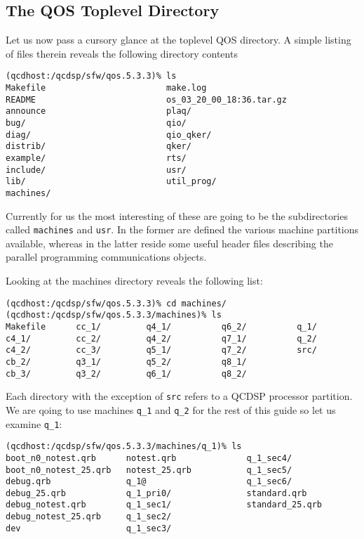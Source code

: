 \subsection{The QOS Toplevel Directory}
Let us now pass a cursory glance at the toplevel QOS directory.
A simple listing of files therein reveals the following directory 
contents
\begin{verbatim}
(qcdhost:/qcdsp/sfw/qos.5.3.3)%	ls
Makefile                        make.log
README                          os_03_20_00_18:36.tar.gz
announce                        plaq/
bug/                            qio/
diag/                           qio_qker/
distrib/                        qker/
example/                        rts/
include/                        usr/
lib/                            util_prog/
machines/
\end{verbatim}

Currently for us the most interesting of these are going to be 
the subdirectories called {\tt machines} and {\tt usr}. In the
former are defined the various machine partitions available, whereas
in the latter reside some useful header files describing the
parallel programming communications objects.

Looking at the machines directory reveals the following list:
\begin{verbatim}
(qcdhost:/qcdsp/sfw/qos.5.3.3)%	cd machines/
(qcdhost:/qcdsp/sfw/qos.5.3.3/machines)% ls
Makefile      cc_1/         q4_1/          q6_2/          q_1/
c4_1/         cc_2/         q4_2/          q7_1/          q_2/
c4_2/         cc_3/         q5_1/          q7_2/          src/
cb_2/         q3_1/         q5_2/          q8_1/
cb_3/         q3_2/         q6_1/          q8_2/
\end{verbatim}

Each directory with the exception of {\tt src} refers to a QCDSP processor
partition. We are qoing to use machines {\tt q\_1} and {\tt q\_2} for the 
rest of this guide so let us examine {\tt q\_1}:
\begin{verbatim}
(qcdhost:/qcdsp/sfw/qos.5.3.3/machines/q_1)% ls
boot_n0_notest.qrb      notest.qrb              q_1_sec4/
boot_n0_notest_25.qrb   notest_25.qrb           q_1_sec5/
debug.qrb               q_1@                    q_1_sec6/
debug_25.qrb            q_1_pri0/               standard.qrb
debug_notest.qrb        q_1_sec1/               standard_25.qrb
debug_notest_25.qrb     q_1_sec2/
dev                     q_1_sec3/
\end{verbatim}

